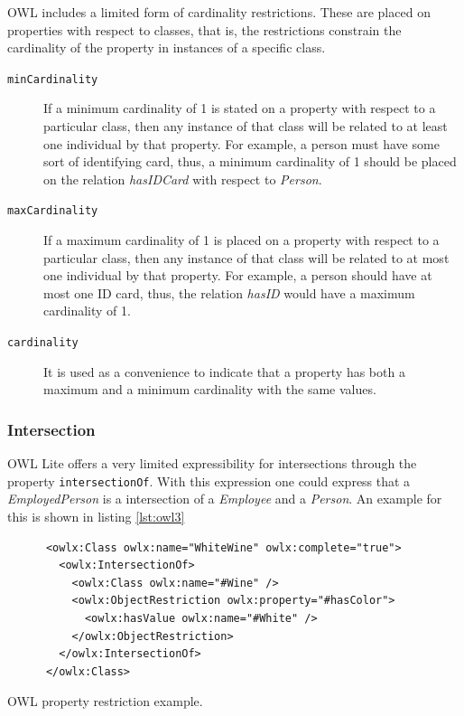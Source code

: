 OWL includes a limited form of cardinality restrictions. These are placed on properties with respect to classes, that is, the restrictions constrain the cardinality of the property in instances of a specific class.

\begin{description}
\item[\texttt{minCardinality}] If a minimum cardinality of 1 is stated on a property with respect to a particular class, then any instance of that class will be related to at least one individual by that property. For example, a person must have some sort of identifying card, thus, a minimum cardinality of 1 should be placed on the relation \textit{hasIDCard} with respect to \textit{Person}.

\item[\texttt{maxCardinality}] If a maximum cardinality of 1 is placed on a property with respect to a particular class, then any instance of that class will be related to at most one individual by that property. For example, a person should have at most one ID card, thus, the relation \textit{hasID} would have a maximum cardinality of 1.

\item[\texttt{cardinality}] It is used as a convenience to indicate that a property has both a maximum and a minimum cardinality with the same values. 
\end{description}

\subsubsection*{Intersection}

OWL Lite offers a very limited expressibility for intersections through the property \texttt{intersectionOf}. With this expression one could express that a \textit{EmployedPerson} is a intersection of a \textit{Employee} and a \textit{Person}. An example for this is shown in listing \ref{lst:owl3}

\begin{listing}[ht]\centering
  \begin{minipage}{.8\textwidth}
    \begin{verbatim}
      <owlx:Class owlx:name="WhiteWine" owlx:complete="true">
        <owlx:IntersectionOf>
          <owlx:Class owlx:name="#Wine" />
          <owlx:ObjectRestriction owlx:property="#hasColor">
            <owlx:hasValue owlx:name="#White" /> 
          </owlx:ObjectRestriction>
        </owlx:IntersectionOf>
      </owlx:Class>
    \end{verbatim}
  \end{minipage}
  \caption{OWL property restriction example.}\label{lst:owl3}
\end{listing}

